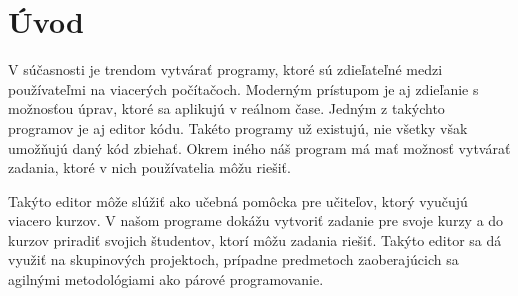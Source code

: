 \chapter*{Úvod} %

V súčasnosti je trendom vytvárať programy, ktoré sú zdieľateľné medzi používateľmi na
viacerých počítačoch. Moderným prístupom je aj zdieľanie s možnosťou úprav, ktoré sa aplikujú
v reálnom čase. Jedným z takýchto programov je aj editor kódu. Takéto programy už existujú, nie všetky
však umožňujú daný kód zbiehať. Okrem iného náš program má mať možnosť vytvárať zadania, ktoré v
nich používatelia môžu riešiť. 

Takýto editor môže slúžiť ako učebná pomôcka pre učiteľov, ktorý vyučujú viacero kurzov. V našom
programe dokážu vytvoriť zadanie pre svoje kurzy a do kurzov priradiť svojich študentov, ktorí
môžu zadania riešiť. Takýto editor sa dá využiť na skupinových projektoch, prípadne predmetoch
zaoberajúcich sa agilnými metodológiami ako párové programovanie.
